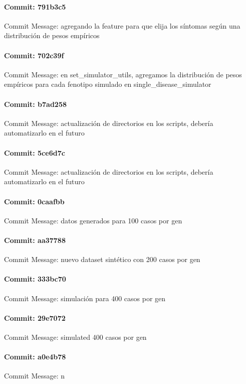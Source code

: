 \documentclass{article}
\begin{document}
\paragraph{Commit: 791b3c5}
Commit Message: agregando la feature para que elija los síntomas según una distribución de pesos empíricos

\paragraph{Commit: 702c39f}
Commit Message: en set_simulator_utils, agregamos la distribución de pesos empíricos para cada fenotipo simulado en single_disease_simulator

\paragraph{Commit: b7ad258}
Commit Message: actualización de directorios en los scripts, debería automatizarlo en el futuro

\paragraph{Commit: 5ce6d7c}
Commit Message: actualización de directorios en los scripts, debería automatizarlo en el futuro

\paragraph{Commit: 0caafbb}
Commit Message: datos generados para 100 casos por gen

\paragraph{Commit: aa37788}
Commit Message: nuevo dataset sintético con 200 casos por gen

\paragraph{Commit: 333bc70}
Commit Message: simulación para 400 casos por gen

\paragraph{Commit: 29e7072}
Commit Message: simulated 400 casos por gen

\paragraph{Commit: a0e4b78}
Commit Message: n
\end{document}
